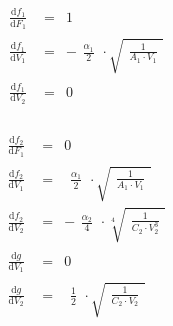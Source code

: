 \documentclass[a4paper,12pt]{article}
\begin{document}
\begin{equation}
   \begin{array}{rcl}
      \begin{matrix} \frac{\text{d}f_1}{\text{d}F_1} \end{matrix} & = & 1 \\[0.1cm]
      \begin{matrix} \frac{\text{d}f_1}{\text{d}V_1} \end{matrix} & = & -\begin{matrix} \frac{\alpha_1}{2} \end{matrix} \cdot \sqrt{ \begin{matrix} \frac{1}{A_1 \cdot V_1} \end{matrix} } \\[0.1cm]
      \begin{matrix} \frac{\text{d}f_1}{\text{d}V_2} \end{matrix} & = & 0 \\[0.1cm]
   \end{array}
\end{equation}

\addtocounter{equation}{-1}

\begin{equation}
   \begin{array}{rcl}
      \begin{matrix} \frac{\text{d}f_2}{\text{d}F_1} \end{matrix} & = & 0 \\[0.1cm]
      \begin{matrix} \frac{\text{d}f_2}{\text{d}V_1} \end{matrix} & = & \begin{matrix} \frac{\alpha_1}{2} \end{matrix} \cdot \sqrt{ \begin{matrix} \frac{1}{A_1 \cdot V_1} \end{matrix} } \\[0.1cm]
      \begin{matrix} \frac{\text{d}f_2}{\text{d}V_2} \end{matrix} & = & -\begin{matrix} \frac{\alpha_2}{4} \end{matrix} \cdot \sqrt[4]{ \begin{matrix} \frac{1}{C_2 \cdot V_2^3} \end{matrix} } \\[0.1cm]
      \begin{matrix} \frac{\text{d}g}{\text{d}V_1} \end{matrix} & = & 0 \\[0.1cm]
      \begin{matrix} \frac{\text{d}g}{\text{d}V_2} \end{matrix} & = & \begin{matrix} \frac{1}{2} \end{matrix} \cdot \sqrt{ \begin{matrix} \frac{1}{C_2 \cdot V_2} \end{matrix} } \\[0.1cm]
   \end{array}
\end{equation}
\end{document}
